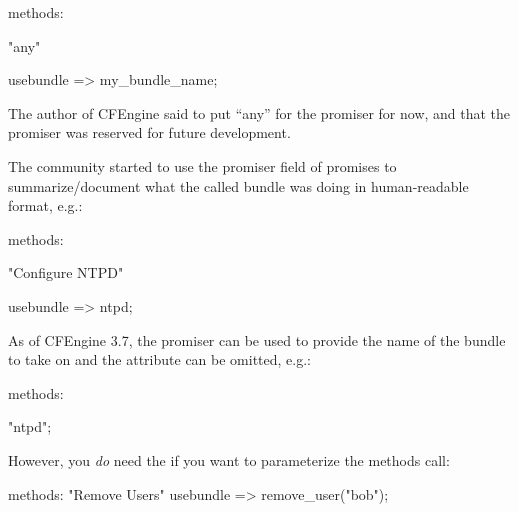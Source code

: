 \begin{code}
methods:

  "any"

    usebundle => my_bundle_name;
\end{code}

The author of CFEngine said to put ``any'' for the promiser for now,
and that the promiser was reserved for future development.





The community started to use the promiser field of  promises
to summarize/document what the called bundle was doing in human-readable
format, e.g.:

\begin{code}
methods:

  "Configure NTPD"

    usebundle => ntpd;
\end{code}





As of CFEngine 3.7, the promiser can be used to provide the name
of the bundle to take on and the  attribute can be
omitted, e.g.:

\begin{code}
methods:

  "ntpd";
\end{code}





However, you \emph{do} need the  if you want to parameterize the methods call:

\begin{code}
  methods:                                                                                                                             
      "Remove Users"                                                                                                                   
        usebundle => remove_user("bob");           
\end{code}

